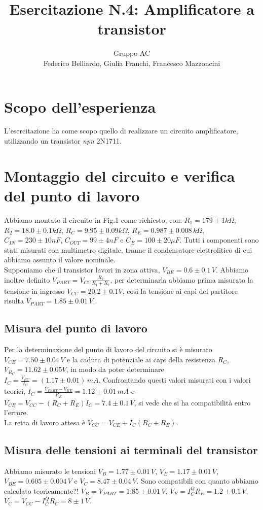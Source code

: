\documentclass[10pt,a4paper]{article}
\author{Gruppo AC \\ Federico Belliardo, Giulia Franchi, Francesco Mazzoncini}
\title{Esercitazione N.4: Amplificatore a transistor}
\begin{document}
\maketitle

\section{Scopo dell'esperienza}
L'esercitazione ha come scopo quello di realizzare un circuito amplificatore, utilizzando un transistor \textit{npn} 2N1711.

\section{Montaggio del circuito e verifica del punto di lavoro}
Abbiamo montato il circuito in Fig.1 come richiesto, con: $R_1= 179\pm1  k\Omega$, $R_2= 18.0\pm0.1  k\Omega$, $R_C= 9.95\pm 0.09  k\Omega$, $R_E= 0.987\pm 0.008 \, k\Omega$, $C_{IN}= 230\pm10  nF$, $C_{OUT}= 99\pm4  nF$ e $C_E= 100\pm20  \mu F$. Tutti i componenti sono stati misurati con multimetro digitale, tranne il condensatore elettrolitico di cui abbiamo assunto il valore nominale.\\
Supponiamo che il transistor lavori in zona attiva, $V_{BE} = 0.6 \pm 0.1 \, V$. Abbiamo inoltre definito $V_{PART}=V_{CC}\frac{R_2}{R_1+R_2}$, per determinarla abbiamo prima misurato la tensione in ingresso $V_{CC}= 20.2\pm0.1 V$, così la tensione ai capi del partitore risulta $V_{PART}=1.85 \pm 0.01\,V$.


\subsection{Misura del punto di lavoro}
Per la determinazione del punto di lavoro del circuito si è misurato $V_{CE}= 7.50\pm0.04 \, V$ e la caduta di potenziale ai capi della resistenza $R_C$, $V_{R_C}= 11.62\pm0.05  V$, in modo da poter determinare $I_C=\frac{V_{RC}}{I_C}= (1.17\pm0.01)\,mA$.
Confrontando questi valori misurati con i valori teorici, $I_C=\frac{V_{PART}-V_{BE}}{R_E}= 1.12\pm0.01\,mA$ e $V_{CE}=V_{CC}-(R_C+R_E)I_C= 7.4\pm0.1\,V$, si vede che si ha compatibilità entro l'errore.\\
La retta di lavoro attesa è  $V_{CC}=V_{CE}+I_C(R_C+R_E)$.


\subsection{Misura delle tensioni ai terminali del transistor}
Abbiamo misurato le tensioni $V_B= 1.77\pm0.01\,V$, $V_E= 1.17\pm0.01\,V$, $V_{BE}= 0.605\pm0.004\,V$ e $V_C= 8.47\pm0.04\,V$. Sono compatibili con quanto abbiamo calcolato teoricamente?! $V_B= V_{PART}=1.85 \pm 0.01\,V$, $V_E=I_C^Q R_E = 1.2 \pm 0.1 \,V$, $V_C=V_{CC}-I_C^Q R_C = 8 \pm 1 \, V$.
\end{document}
